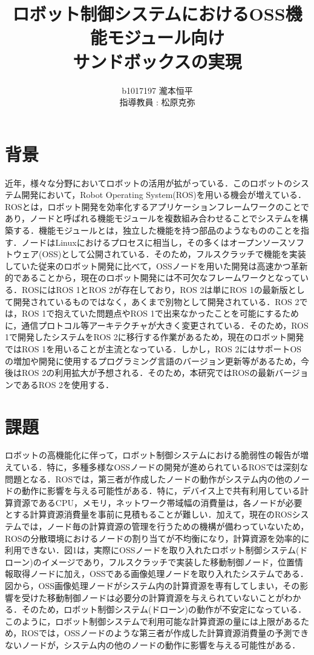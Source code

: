 \documentclass[11pt]{ujarticle} %
\author{
b1017197 瀧本恒平\\指導教員 : 松原克弥
}
\title{ロボット制御システムにおけるOSS機能モジュール向け\\サンドボックスの実現}
\begin{document}
\maketitle

\section{背景}
近年，様々な分野においてロボットの活用が拡がっている\cite{Pepper}\cite{RoBoHoN}．このロボットのシステム開発において，Robot Operating System(ROS)を用いる機会が増えている．ROSとは，ロボット開発を効率化するアプリケーションフレームワークのことであり，ノードと呼ばれる機能モジュールを複数組み合わせることでシステムを構築する．機能モジュールとは，独立した機能を持つ部品のようなもののことを指す．ノードはLinuxにおけるプロセスに相当し，その多くはオープンソースソフトウェア(OSS)として公開されている．そのため，フルスクラッチで機能を実装していた従来のロボット開発に比べて，OSSノードを用いた開発は高速かつ革新的であることから，現在のロボット開発には不可欠なフレームワークとなっている．ROSにはROS 1とROS 2が存在しており，ROS 2は単にROS 1の最新版として開発されているものではなく，あくまで別物として開発されている．ROS 2では，ROS 1で抱えていた問題点やROS 1で出来なかったことを可能にするために，通信プロトコル等アーキテクチャが大きく変更されている．そのため，ROS 1で開発したシステムをROS 2に移行する作業があるため，現在のロボット開発ではROS 1を用いることが主流となっている．しかし，ROS 2にはサポートOSの増加や開発に使用するプログラミング言語のバージョン更新等があるため，今後はROS 2の利用拡大が予想される．そのため，本研究ではROSの最新バージョンであるROS 2を使用する．

\section{課題}
ロボットの高機能化に伴って，ロボット制御システムにおける脆弱性の報告が増えている．特に，多種多様なOSSノードの開発が進められている\cite{AutoWare}ROSでは深刻な問題となる．ROSでは，第三者が作成したノードの動作がシステム内の他のノードの動作に影響を与える可能性がある．特に，デバイス上で共有利用している計算資源であるCPU，メモリ，ネットワーク帯域幅の消費量は，各ノードが必要とする計算資源消費量を事前に見積もることが難しい．加えて，現在のROSシステムでは，ノード毎の計算資源の管理を行うための機構が備わっていないため，ROSの分散環境におけるノードの割り当てが不均衡になり，計算資源を効率的に利用できない\cite{ResourceManeger}．図1は，実際にOSSノードを取り入れたロボット制御システム(ドローン)のイメージであり，フルスクラッチで実装した移動制御ノード，位置情報取得ノードに加え，OSSである画像処理ノードを取り入れたシステムである．図から，OSS画像処理ノードがシステム内の計算資源を専有してしまい，その影響を受けた移動制御ノードは必要分の計算資源を与えられていないことがわかる．そのため，ロボット制御システム(ドローン)の動作が不安定になっている．このように，ロボット制御システムで利用可能な計算資源の量には上限があるため，ROSでは，OSSノードのような第三者が作成した計算資源消費量の予測できないノードが，システム内の他のノードの動作に影響を与える可能性がある．
\end{document}
